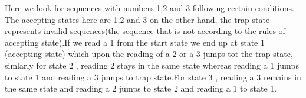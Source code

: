 
Here we look for sequences with numbers 1,2 and 3 following certain conditions. The accepting states here are 1,2 and 3 on the other hand, the trap state represents invalid sequences(the sequence that is not according to the rules of accepting state).If we read a 1 from the start state we end up at state 1 (accepting state) which upon the reading of a 2 or a 3 jumps tot the trap state, simlarly for state 2 , reading 2 stays in the same state whereas reading a 1 jumps to state 1 and reading a 3 jumps to trap state.For state 3 , reading a 3 remains in the same state and reading a 2 jumps to state 2 and reading a 1 to state 1.


